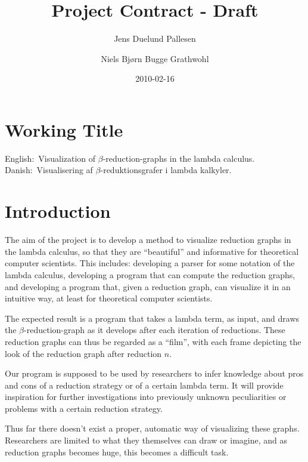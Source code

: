 \documentclass[11pt,oneside,a4paper]{article}
\title{Project Contract - Draft}
\author{Jens Duelund Pallesen \and
Niels Bjørn Bugge Grathwohl}
\date{2010-02-16}
\begin{document}
\maketitle


\section{Working Title}

English$:$ Visualization of $\beta$-reduction-graphs in the lambda calculus.\\
Danish$: $ Visualisering af $\beta$-reduktionsgrafer i lambda kalkyler.

\section{Introduction}

The aim of the project is to develop a method to visualize reduction graphs in
the lambda calculus, so that they are ``beautiful'' and informative for theoretical computer scientists. This includes: developing a parser for some notation of the lambda calculus, developing a program that can compute the reduction graphs, and developing a program that, given a reduction graph, can visualize it in an intuitive way, at least for theoretical computer scientists.


The expected result is a program that takes a lambda term, as input, and draws the $\beta$-reduction-graph as it develops after each iteration of reductions. These reduction graphs can thus be regarded as a ``film'', with each frame depicting the look of the reduction graph after reduction $n$.


Our program is supposed to be used by researchers to infer knowledge about pros and cons of a reduction strategy or of a certain lambda term. It will provide inspiration for further investigations into previously unknown peculiarities or problems with a certain reduction strategy.

Thus far there doesn't exist a proper, automatic way of visualizing these graphs. Researchers are limited to what they themselves can draw or imagine, and as reduction graphs becomes huge, this becomes a difficult task. 

\end{document}
